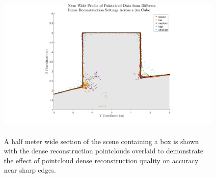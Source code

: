\begin{figure}[H]
	\centering
	\includegraphics[height = 3in]{../fig/boxprofile}

	\caption{A half meter wide section of the scene containing a box is shown with the dense reconstruction pointclouds overlaid to demonstrate the effect of pointcloud dense reconstruction quality on accuracy near sharp edges.}
	\label{fig:boxplot}
\end{figure}